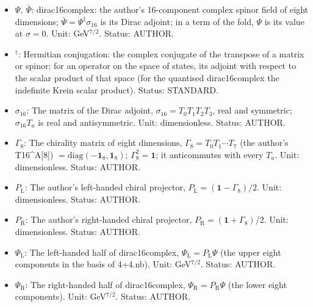 \documentclass[
  10pt,
]{article}
\begin{document}
\begin{itemize}
  the metric: \(g_{MN} = \eta_{ab}\,\mathbf{e}^a{}_M\mathbf{e}^b{}_N\);
  \(\mathbf{e}_a{}^M\) is its inverse;
  \(\mathbf{e}_{bN} = \eta_{bc}\mathbf{e}^c{}_N\); \(\mathbf{e}^{(a)}\)
  is the frame one-form \(\mathbf{e}^a{}_M\,\mathrm{d}X^M\). Unit:
  dimensionless. Status: STANDARD.
\item
  \(\Psi,\ \bar\Psi\): dirac16complex: the author's 16-component complex
  spinor field of eight dimensions;
  \(\bar\Psi = \Psi^\dagger\sigma_{16}\) is its Dirac adjoint; in a term
  of the fold, \(\Psi\) is its value at \(\sigma = 0\). Unit:
  GeV\(^{7/2}\). Status: AUTHOR.
\item
  \({}^\dagger\): Hermitian conjugation: the complex conjugate of the
  transpose of a matrix or spinor; for an operator on the space of
  states, its adjoint with respect to the scalar product of that space
  (for the quantised dirac16complex the indefinite Krein scalar
  product). Status: STANDARD.
\item
  \(\sigma_{16}\): The matrix of the Dirac adjoint,
  \(\sigma_{16} = T_0T_1T_2T_3\), real and symmetric; \(\sigma_{16}T_a\)
  is real and antisymmetric. Unit: dimensionless. Status: AUTHOR.
\item
  \(\Gamma_8\): The chirality matrix of eight dimensions,
  \(\Gamma_8 = T_0T_1\cdots T_7\) (the author's T16\^{}A{[}8{]})
  \(= \mathrm{diag}(-\mathbf{1}_8, \mathbf{1}_8)\);
  \(\Gamma_8^2 = \mathbf{1}\); it anticommutes with every \(T_a\). Unit:
  dimensionless. Status: AUTHOR.
\item
  \(P_{\mathrm{L}}\): The author's left-handed chiral projector,
  \(P_{\mathrm{L}} = (\mathbf{1} - \Gamma_8)/2\). Unit: dimensionless.
  Status: AUTHOR.
\item
  \(P_{\mathrm{R}}\): The author's right-handed chiral projector,
  \(P_{\mathrm{R}} = (\mathbf{1} + \Gamma_8)/2\). Unit: dimensionless.
  Status: AUTHOR.
\item
  \(\Psi_{\mathrm{L}}\): The left-handed half of dirac16complex,
  \(\Psi_{\mathrm{L}} = P_{\mathrm{L}}\Psi\) (the upper eight components
  in the basis of 4+4.nb). Unit: GeV\(^{7/2}\). Status: AUTHOR.
\item
  \(\Psi_{\mathrm{R}}\): The right-handed half of dirac16complex,
  \(\Psi_{\mathrm{R}} = P_{\mathrm{R}}\Psi\) (the lower eight
  components). Unit: GeV\(^{7/2}\). Status: AUTHOR.
\end{itemize}
\end{document}
